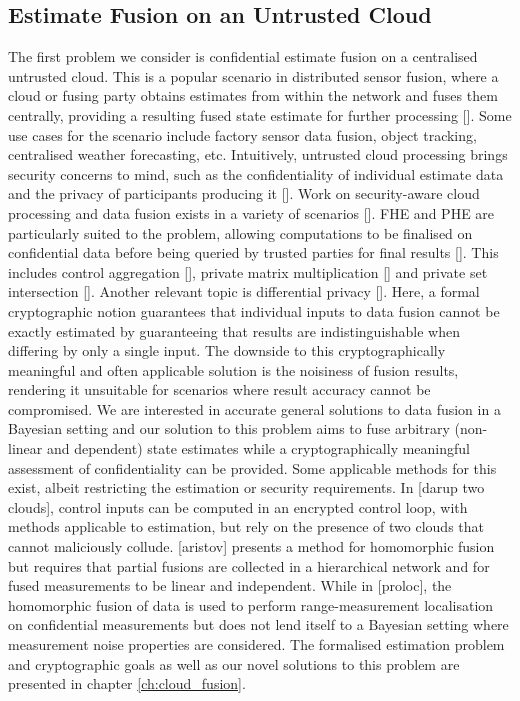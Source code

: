 \subsection{Estimate Fusion on an Untrusted Cloud}\label{subsec:intro:conf_est_fusion}
The first problem we consider is confidential estimate fusion on a centralised untrusted cloud. This is a popular scenario in distributed sensor fusion, where a cloud or fusing party obtains estimates from within the network and fuses them centrally, providing a resulting fused state estimate for further processing []. Some use cases for the scenario include factory sensor data fusion, object tracking, centralised weather forecasting, etc. Intuitively, untrusted cloud processing brings security concerns to mind, such as the confidentiality of individual estimate data and the privacy of participants producing it []. Work on security-aware cloud processing and data fusion exists in a variety of scenarios []. FHE and PHE are particularly suited to the problem, allowing computations to be finalised on confidential data before being queried by trusted parties for final results []. This includes control aggregation [], private matrix multiplication [] and private set intersection []. Another relevant topic is differential privacy []. Here, a formal cryptographic notion guarantees that individual inputs to data fusion cannot be exactly estimated by guaranteeing that results are indistinguishable when differing by only a single input. The downside to this cryptographically meaningful and often applicable solution is the noisiness of fusion results, rendering it unsuitable for scenarios where result accuracy cannot be compromised. We are interested in accurate general solutions to data fusion in a Bayesian setting and our solution to this problem aims to fuse arbitrary (non-linear and dependent) state estimates while a cryptographically meaningful assessment of confidentiality can be provided. Some applicable methods for this exist, albeit restricting the estimation or security requirements. In [darup two clouds], control inputs can be computed in an encrypted control loop, with methods applicable to estimation, but rely on the presence of two clouds that cannot maliciously collude. [aristov] presents a method for homomorphic fusion but requires that partial fusions are collected in a hierarchical network and for fused measurements to be linear and independent. While in [proloc], the homomorphic fusion of data is used to perform range-measurement localisation on confidential measurements but does not lend itself to a Bayesian setting where measurement noise properties are considered. The formalised estimation problem and cryptographic goals as well as our novel solutions to this problem are presented in chapter \ref{ch:cloud_fusion}.

